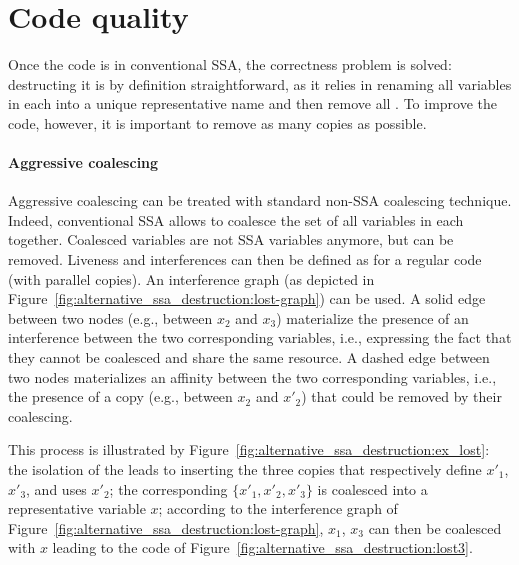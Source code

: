 \section{Code quality}
\label{sec:destruct:quality}
Once the code is in conventional SSA, the correctness problem is solved: 
destructing it is by definition straightforward, as it relies in renaming all variables in each \phiweb into a unique representative name and then remove all \phifuns. 
To improve the code, however, it is important to remove as many copies as possible.

\paragraph{Aggressive coalescing}
Aggressive coalescing can be treated with standard non-SSA coalescing technique.
Indeed, conventional SSA allows to coalesce the set of all variables in each \phiweb together.
Coalesced variables are not SSA variables anymore, but \phifuns can be removed.
Liveness and interferences can then be defined as for a regular code (with parallel copies). 
An interference graph (as depicted in Figure~\ref{fig:alternative_ssa_destruction:lost-graph}) can be used. 
A solid edge between two nodes (e.g., between $x_2$ and $x_3$) materialize the presence of an interference between the two corresponding variables, i.e., expressing the fact that they cannot be coalesced and share the same resource. 
A dashed edge between two nodes materializes an affinity between the two corresponding variables, i.e., the presence of a copy (e.g., between $x_2$ and $x'_2$) that could be removed by their coalescing.

This process is illustrated by Figure~\ref{fig:alternative_ssa_destruction:ex_lost}: 
the isolation of the \phifun leads to inserting the three copies that respectively define $x'_1$, $x'_3$, and uses $x'_2$; 
the corresponding \phiweb $\{x'_1, x'_2, x'_3\}$ is coalesced into a representative variable $x$; 
according to the interference graph of Figure~\ref{fig:alternative_ssa_destruction:lost-graph}, $x_1$, $x_3$ can then be coalesced with $x$ leading to the code of Figure~\ref{fig:alternative_ssa_destruction:lost3}.

